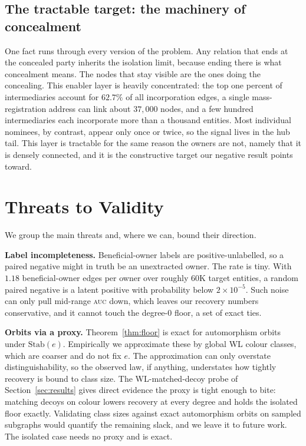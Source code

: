 \documentclass[sigconf]{acmart}
\begin{document}
\subsection{The tractable target: the machinery of concealment}
One fact runs through every version of the problem. Any relation that ends at the
concealed party inherits the isolation limit, because ending there is what
concealment means. The nodes that stay visible are the ones doing the concealing.
This enabler layer is heavily concentrated: the top one percent of intermediaries
account for $62.7\%$ of all incorporation edges, a single mass-registration
address can link about $37{,}000$ nodes, and a few hundred intermediaries each
incorporate more than a thousand entities. Most individual nominees, by contrast,
appear only once or twice, so the signal lives in the hub tail. This layer is
tractable for the same reason the owners are not, namely that it is densely
connected, and it is the constructive target our negative result points toward.

\section{Threats to Validity}\label{sec:threats}
We group the main threats and, where we can, bound their direction.

\textbf{Label incompleteness.} Beneficial-owner labels are positive-unlabelled,
so a paired negative might in truth be an unextracted owner. The rate is tiny.
With $1.18$ beneficial-owner edges per owner over roughly $60$K target entities, a
random paired negative is a latent positive with probability below $2\times
10^{-5}$. Such noise can only pull mid-range \textsc{auc} down, which leaves our
recovery numbers conservative, and it cannot touch the degree-$0$ floor, a set of
exact ties.

\textbf{Orbits via a proxy.} Theorem~\ref{thm:floor} is exact for automorphism
orbits under $\mathrm{Stab}(e)$. Empirically we approximate these by global WL
colour classes, which are coarser and do not fix $e$. The approximation can only
overstate distinguishability, so the observed law, if anything, understates how
tightly recovery is bound to class size. The WL-matched-decoy probe of
Section~\ref{sec:results} gives direct evidence the proxy is tight enough to bite:
matching decoys on colour lowers recovery at every degree and holds the isolated
floor exactly. Validating class sizes against exact automorphism orbits on sampled
subgraphs would quantify the remaining slack, and we leave it to future work. The
isolated case needs no proxy and is exact.
\end{document}
